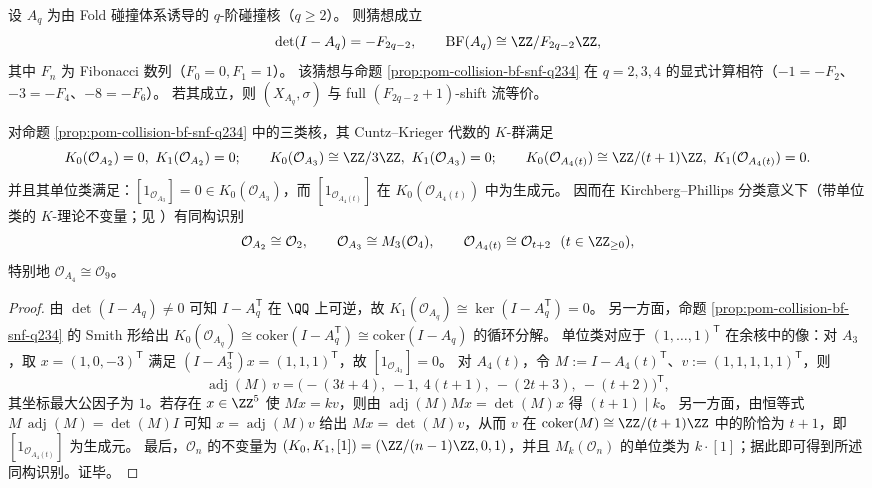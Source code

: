 \begin{conjecture}\label{conj:pom-collision-fibonacci-twist}
设 \(A_q\) 为由 Fold 碰撞体系诱导的 \(q\)-阶碰撞核（\(q\ge 2\)）。
则猜想成立
\[
\det(I-A_q)=-F_{2q-2},
\qquad
\mathrm{BF}(A_q)\cong \ZZ/F_{2q-2}\ZZ,
\]
其中 \(F_n\) 为 Fibonacci 数列（\(F_0=0,F_1=1\)）。
该猜想与命题 \ref{prop:pom-collision-bf-snf-q234} 在 \(q=2,3,4\) 的显式计算相符（\(-1=-F_2\)、\(-3=-F_4\)、\(-8=-F_6\)）。
若其成立，则 \((X_{A_q},\sigma)\) 与 full \((F_{2q-2}+1)\)-shift 流等价。
\end{conjecture}



\begin{proposition}\label{prop:pom-collision-ck-classification-q234}
对命题 \ref{prop:pom-collision-bf-snf-q234} 中的三类核，其 Cuntz--Krieger 代数的 \(K\)-群满足
\[
K_0(\mathcal O_{A_2})=0,\ K_1(\mathcal O_{A_2})=0;\qquad
K_0(\mathcal O_{A_3})\cong \ZZ/3\ZZ,\ K_1(\mathcal O_{A_3})=0;\qquad
K_0(\mathcal O_{A_4(t)})\cong \ZZ/(t+1)\ZZ,\ K_1(\mathcal O_{A_4(t)})=0.
\]
并且其单位类满足：\([1_{\mathcal O_{A_3}}]=0\in K_0(\mathcal O_{A_3})\)，而 \([1_{\mathcal O_{A_4(t)}}]\) 在 \(K_0(\mathcal O_{A_4(t)})\) 中为生成元。
因而在 Kirchberg--Phillips 分类意义下（带单位类的 \(K\)-理论不变量；见 \cite{Phillips2000ClassificationPurelyInfinite}）有同构识别
\[
\mathcal O_{A_2}\cong \mathcal O_2,\qquad
\mathcal O_{A_3}\cong M_3(\mathcal O_4),\qquad
\mathcal O_{A_4(t)}\cong \mathcal O_{t+2}\ \ (t\in\ZZ_{\ge 0}),
\]
特别地 \(\mathcal O_{A_4}\cong \mathcal O_9\)。
\end{proposition}
\begin{proof}
由 \(\det(I-A_q)\neq 0\) 可知 \(I-A_q^\mathsf T\) 在 \(\QQ\) 上可逆，故 \(K_1(\mathcal O_{A_q})\cong\ker(I-A_q^\mathsf T)=0\)。
另一方面，命题 \ref{prop:pom-collision-bf-snf-q234} 的 Smith 形给出
\(
K_0(\mathcal O_{A_q})\cong\mathrm{coker}(I-A_q^\mathsf T)\cong\mathrm{coker}(I-A_q)
\)
的循环分解。
单位类对应于 \((1,\dots,1)^{\mathsf T}\) 在余核中的像：对 \(A_3\)，取 \(x=(1,0,-3)^{\mathsf T}\) 满足
\(
(I-A_3^\mathsf T)x=(1,1,1)^{\mathsf T}
\)，故 \([1_{\mathcal O_{A_3}}]=0\)。
对 \(A_4(t)\)，令 \(M:=I-A_4(t)^\mathsf T\)、\(v:=(1,1,1,1,1)^{\mathsf T}\)，则
\[
\operatorname{adj}(M)\,v=\bigl(-(3t+4),\ -1,\ 4(t+1),\ -(2t+3),\ -(t+2)\bigr)^{\mathsf T},
\]
其坐标最大公因子为 \(1\)。若存在 \(x\in\ZZ^{5}\) 使 \(Mx=kv\)，则由 \(\operatorname{adj}(M)Mx=\det(M)x\) 得 \((t+1)\mid k\)。
另一方面，由恒等式 \(M\,\operatorname{adj}(M)=\det(M)I\) 可知 \(x=\operatorname{adj}(M)v\) 给出 \(Mx=\det(M)v\)，从而 \(v\) 在 \(\mathrm{coker}(M)\cong \ZZ/(t+1)\ZZ\) 中的阶恰为 \(t+1\)，即 \([1_{\mathcal O_{A_4(t)}}]\) 为生成元。
最后，\(\mathcal O_n\) 的不变量为 \((K_0,K_1,[1])=(\ZZ/(n-1)\ZZ,0,1)\)，并且 \(M_k(\mathcal O_n)\) 的单位类为 \(k\cdot [1]\)；据此即可得到所述同构识别。证毕。
\end{proof}

